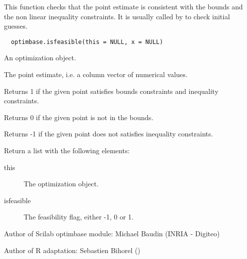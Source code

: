 %
\begin{Description}\relax
This function checks that the point estimate is consistent with the bounds
and the non linear inequality constraints. It is usually called by  
 to check initial guesses.
\end{Description}
%
\begin{Usage}
\begin{verbatim}
  optimbase.isfeasible(this = NULL, x = NULL)
\end{verbatim}
\end{Usage}
%
\begin{Arguments}
\begin{ldescription}
\item[\code{this}] An optimization object.
\item[\code{x}] The point estimate, i.e. a column vector of numerical values.
\end{ldescription}
\end{Arguments}
%
\begin{Details}\relax
Returns 1 if the given point satisfies bounds constraints and inequality
constraints.

Returns 0 if the given point is not in the bounds.

Returns -1 if the given point does not satisfies inequality constraints.
\end{Details}
%
\begin{Value}
Return a list with the following elements: \begin{description}

\item[this] The optimization object.
\item[isfeasible] The feasibility flag, either -1, 0 or 1.

\end{description}

\end{Value}
%
\begin{Author}\relax
Author of Scilab optimbase module: Michael Baudin (INRIA - Digiteo)

Author of R adaptation: Sebastien Bihorel ()
\end{Author}
%
\begin{SeeAlso}\relax
{}
\end{SeeAlso}
